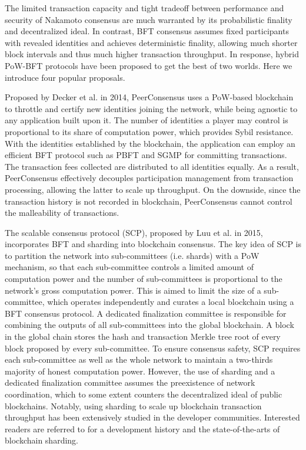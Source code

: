 The limited transaction capacity and tight tradeoff between performance and security of Nakamoto consensus are much warranted by its probabilistic finality and decentralized ideal. In contrast, BFT consensus assumes fixed participants with revealed identities and achieves deterministic finality, allowing much shorter block intervals and thus much higher transaction throughput. In response, hybrid PoW-BFT protocols have been proposed to get the best of two worlds. Here we introduce four popular proposals.

Proposed by Decker et al.  in 2014, PeerConsensus uses a PoW-based blockchain to throttle and certify new identities joining the network, while being agnostic to any application built upon it. The number of identities a player may control is proportional to its share of computation power, which provides Sybil resistance. With the identities established by the blockchain, the application can employ an efficient BFT protocol such as PBFT and SGMP  for committing transactions. The transaction fees collected are distributed to all identities equally. As a result, PeerConsensus effectively decouples participation management from transaction processing, allowing the latter to scale up throughput. On the downside, since the transaction history is not recorded in blockchain, PeerConsensus cannot control the malleability of transactions.

The scalable consensus protocol (SCP), proposed by
Luu et al.  in 2015, incorporates BFT and sharding into blockchain consensus. The key idea of SCP is to partition the network into sub-committees (i.e. shards) with a PoW mechanism, so that each sub-committee controls a limited amount of computation power and the number of sub-committees is proportional to the network's gross computation power. This is aimed to limit the size of a sub-committee, which operates independently and curates a local blockchain using a BFT consensus protocol. A dedicated finalization committee is responsible for combining the outputs of all sub-committees into the global blockchain. A block in the global chain stores the hash and transaction Merkle tree root of every block proposed by every sub-committee. To ensure consensus safety, SCP requires each sub-committee as well as the whole network to maintain a two-thirds majority of honest computation power. However, the use of sharding and a dedicated finalization committee assumes the preexistence of network coordination, which to some extent counters the decentralized ideal of public blockchains. 
Notably, using sharding to scale up blockchain transaction throughput has been extensively studied in the developer communities. Interested readers are referred to  for a development history and the state-of-the-arts of blockchain sharding.

